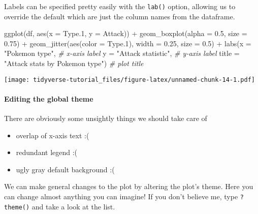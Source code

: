 \documentclass[
]{article}
\newenvironment{Shaded}{\begin{snugshade}}{\end{snugshade}}
\newcommand{\AttributeTok}[1]{\textcolor[rgb]{0.77,0.63,0.00}{#1}}
\newcommand{\CommentTok}[1]{\textcolor[rgb]{0.56,0.35,0.01}{\textit{#1}}}
\newcommand{\FloatTok}[1]{\textcolor[rgb]{0.00,0.00,0.81}{#1}}
\newcommand{\FunctionTok}[1]{\textcolor[rgb]{0.00,0.00,0.00}{#1}}
\newcommand{\NormalTok}[1]{#1}
\newcommand{\SpecialCharTok}[1]{\textcolor[rgb]{0.00,0.00,0.00}{#1}}
\newcommand{\StringTok}[1]{\textcolor[rgb]{0.31,0.60,0.02}{#1}}
\begin{document}
Labels can be specified pretty easily with the \texttt{lab()} option,
allowing us to override the default which are just the column names from
the dataframe.

\begin{Shaded}
\begin{Highlighting}[]
\FunctionTok{ggplot}\NormalTok{(df, }\FunctionTok{aes}\NormalTok{(}\AttributeTok{x =}\NormalTok{ Type}\FloatTok{.1}\NormalTok{, }\AttributeTok{y =}\NormalTok{ Attack)) }\SpecialCharTok{+}
  \FunctionTok{geom\_boxplot}\NormalTok{(}\AttributeTok{alpha =} \FloatTok{0.5}\NormalTok{,                     }
               \AttributeTok{size =} \FloatTok{0.75}\NormalTok{) }\SpecialCharTok{+}                   
  \FunctionTok{geom\_jitter}\NormalTok{(}\FunctionTok{aes}\NormalTok{(}\AttributeTok{color =}\NormalTok{ Type}\FloatTok{.1}\NormalTok{),}
              \AttributeTok{width =} \FloatTok{0.25}\NormalTok{,                     }
              \AttributeTok{size =} \FloatTok{0.5}\NormalTok{) }\SpecialCharTok{+}
  \FunctionTok{labs}\NormalTok{(}\AttributeTok{x =} \StringTok{"Pokemon type"}\NormalTok{,                       }\CommentTok{\# x{-}axis label}
       \AttributeTok{y =} \StringTok{"Attack statistic"}\NormalTok{,                   }\CommentTok{\# y{-}axis label}
       \AttributeTok{title =} \StringTok{"Attack stats by Pokemon type"}\NormalTok{)   }\CommentTok{\# plot title}
\end{Highlighting}
\end{Shaded}

\texttt{[image: tidyverse-tutorial\_files/figure-latex/unnamed-chunk-14-1.pdf]}

\hypertarget{editing-the-global-theme}{%
\paragraph{Editing the global theme}\label{editing-the-global-theme}}

There are obviously some unsightly things we should take care of

\begin{itemize}
\item
  overlap of x-axis text :(
\item
  redundant legend :(
\item
  ugly gray default background :(
\end{itemize}

We can make general changes to the plot by altering the plot's theme.
Here you can change almost anything you can imagine! If you don't
believe me, type \texttt{?theme()} and take a look at the list.
\end{document}
